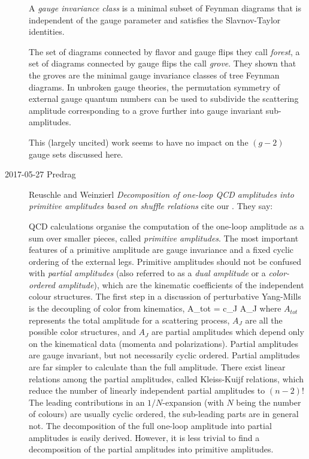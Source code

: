 \begin{description}
A \emph{gauge invariance class} is a minimal subset of Feynman diagrams
that is independent of the gauge parameter and satisfies the
Slavnov-Taylor identities.

The set of diagrams connected by flavor and gauge flips they call
\emph{forest}, a set of diagrams connected by gauge flips the call
\emph{grove}. They shown that the groves are the minimal gauge invariance
classes of tree Feynman diagrams. In unbroken gauge theories, the
permutation symmetry of external gauge quantum numbers can be used to
subdivide the scattering amplitude corresponding to a grove further into
gauge invariant sub-amplitudes.

This (largely uncited) work seems to have no impact on the $(g-2)$
gauge sets discussed here.

\item[2017-05-27 Predrag]
Reuschle and Weinzierl {\em Decomposition of one-loop {QCD}
amplitudes into primitive amplitudes based on shuffle relations}
cite our . They say:

QCD calculations organise the computation of the one-loop amplitude as a sum
over smaller pieces, called \emph{primitive amplitudes}.
The most important features of a primitive amplitude are gauge invariance
and a fixed cyclic ordering of the external legs.
Primitive amplitudes should not be confused with \emph{partial amplitudes}
(also referred to as a \emph{dual amplitude} or a \emph{color-ordered amplitude}),
which are the kinematic coefficients of the independent colour
structures.
The first step in a discussion of perturbative Yang-Mills is the
decoupling of color from kinematics,
\beq
A_{tot} = \sum c_J A_J
where $A_{tot}$ represents the total amplitude for a scattering process,
$A_J $ are all the possible color structures,
and $A_J$ are partial amplitudes which depend only on the kinematical data
(momenta and polarizations).
Partial amplitudes are gauge invariant, but not
necessarily cyclic ordered.
Partial amplitudes are far simpler to calculate than the
full amplitude. There
exist linear relations among the partial amplitudes, called
Kleiss-Kuijf relations, which reduce the number of linearly
independent partial amplitudes to $(n-2)!$
The leading contributions in an $1/N$-expansion (with $N$ being the number of colours)
are usually cyclic ordered, the sub-leading parts are in general not.
The decomposition of the full one-loop amplitude into partial amplitudes is easily derived.
However, it is less trivial to find a decomposition of the partial
amplitudes into primitive amplitudes.


\end{description}

